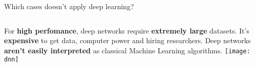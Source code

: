 
\begin{frame}[t]{Which cases doesn't apply deep learning?} %
        \begin{columns}[c]
                        For \textbf{high perfomance}, deep networks require \textbf{extremely large} datasets.  
                        \newline
                        \newline
                        It's \textbf{expensive} to get data, computer power and hiring researchers.
                        \newline
                        \newline
                        Deep networks \textbf{aren't easily interpreted} as classical Machine Learning algorithms.
                    \texttt{[image: dnn]}
            \end{columns}
        
    
\end{frame}

